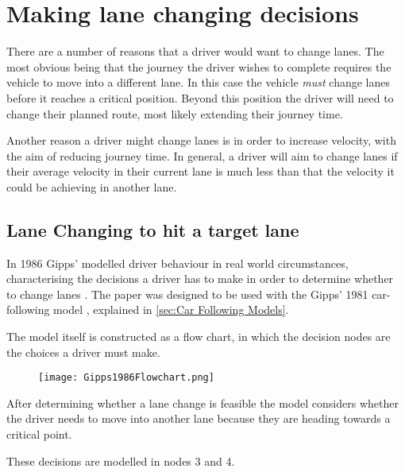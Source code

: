\section{Making lane changing decisions}
\label{sec:Making lane changing decisions}
There are a number of reasons that a driver would want to change lanes. The most obvious being that the journey the driver wishes to complete requires the vehicle to move into a different lane. In this case the vehicle \emph{must} change lanes before it reaches a critical position. Beyond this position the driver will need to change their planned route, most likely extending their journey time. 

Another reason a driver might change lanes is in order to increase velocity, with the aim of reducing journey time. In general, a driver will aim to change lanes if their average velocity in their current lane is much less than that the velocity it could be achieving in another lane.

\subsection{Lane Changing to hit a target lane}
\label{subsec:Lane Changing to hit a target lane}
In 1986 Gipps' modelled driver behaviour in real world circumstances, characterising the decisions a driver has to make in order to determine whether to change lanes \citep{Gipps1986}. The paper was designed to be used with the Gipps' 1981 car-following model \citep{Gipps1981}, explained in \ref{sec:Car Following Models}.

The model itself is constructed as a flow chart, in which the decision nodes are the choices a driver must make. 

\begin{figure}[htb]
\texttt{[image: Gipps1986Flowchart.png]}
\caption{}
\end{figure}

After determining whether a lane change is feasible the model considers whether the driver needs to move into another lane because they are heading towards a critical point.

These decisions are modelled in nodes 3 and 4.

